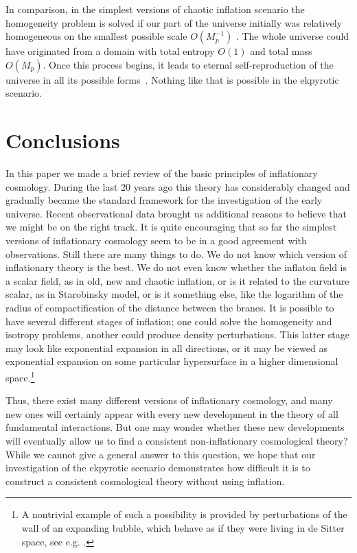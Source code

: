 \documentclass[a4paper,12pt]{article}
\begin{document}
In comparison, in the simplest versions of chaotic inflation scenario the
homogeneity problem is solved if our part of the universe initially was
relatively homogeneous on the smallest possible scale $O(M_p^{-1})$
\cite{Chaot}. The whole universe could have originated from a  domain with
total entropy $O(1)$ and  total mass $O(M_p)$. Once this process begins,
it leads to eternal self-reproduction of the universe in all its possible
forms~\cite{Eternal,book}. Nothing like that is possible in the ekpyrotic
scenario.

\section{Conclusions}
   
In this paper we made a brief review of the basic principles of inflationary cosmology. During the last 20 years ago this theory has considerably changed and gradually became the standard framework for the investigation of the early universe. Recent observational data brought us additional reasons to believe that we might be on the right track.  It is quite encouraging that so far the simplest versions of inflationary cosmology seem to be in a good agreement with observations. Still there are many things to do. We do not know which  version  of inflationary theory is the best.  We do not even know whether the inflaton field is a scalar field, as in old, new and chaotic inflation, or is it related to the curvature scalar, as in Starobinsky model, or is it something else, like the logarithm of the radius of compactification of the distance between the branes. It is possible to have several different stages of inflation; one could solve the homogeneity and isotropy problems, another could produce density perturbations. This latter stage may look like exponential expansion in all directions, or it may be viewed as exponential expansion on some particular hypersurface in a higher dimensional space.\footnote{A nontrivial example of such a possibility is provided by  perturbations of the wall of an expanding bubble, which behave as if they were living in de Sitter space, see e.g. \cite{VilGarr}.}   

Thus, there exist many different versions of inflationary cosmology, and many new ones will certainly appear with every new development in the theory of all fundamental interactions.  But one may wonder whether these new developments  will eventually allow us to find a consistent non-inflationary cosmological theory?  While we cannot give a general answer to this question, we hope that our investigation of the ekpyrotic scenario demonstrates  how difficult it is to construct a consistent cosmological theory without using inflation.
\end{document}
